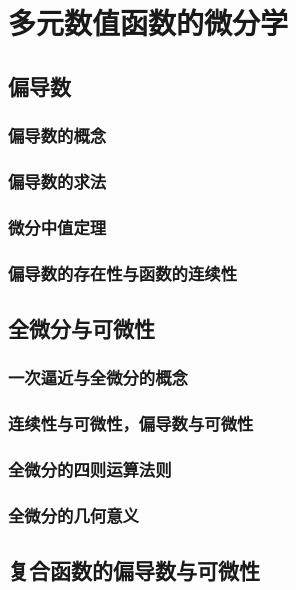 

\chapter{多元数值函数的微分学}\label{ch:16}
\section{偏导数}
\subsection{偏导数的概念}
\subsection{偏导数的求法}
\subsection{微分中值定理}
\subsection{偏导数的存在性与函数的连续性}
\begin{exercise}

\end{exercise}
\section{全微分与可微性}
\subsection{一次逼近与全微分的概念}
\subsection{连续性与可微性，偏导数与可微性}
\subsection{全微分的四则运算法则}
\subsection{全微分的几何意义}
\begin{exercise}

\end{exercise}
\section{复合函数的偏导数与可微性}
